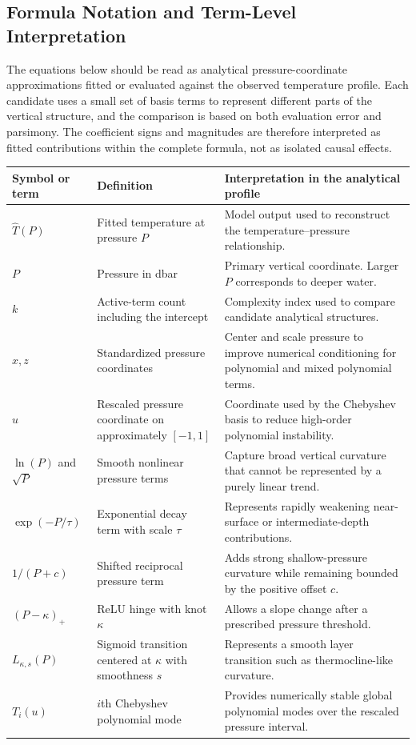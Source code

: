 \documentclass[10pt]{article}
\begin{document}
\subsection{Formula Notation and Term-Level Interpretation}

\noindent
The equations below should be read as analytical pressure-coordinate approximations fitted or evaluated against the observed temperature profile.
Each candidate uses a small set of basis terms to represent different parts of the vertical structure, and the comparison is based on both evaluation error and parsimony.
The coefficient signs and magnitudes are therefore interpreted as fitted contributions within the complete formula, not as isolated causal effects.

\vspace{0.35em}
\begingroup
\small
\setlength{\tabcolsep}{5pt}
\renewcommand{\arraystretch}{1.18}
\begin{tabular}{L{3.2cm}L{4.4cm}L{7.0cm}}
\toprule
Symbol or term & Definition & Interpretation in the analytical profile \\
\midrule
$\hat{T}(P)$ & Fitted temperature at pressure $P$ & Model output used to reconstruct the temperature--pressure relationship. \\
$P$ & Pressure in dbar & Primary vertical coordinate. Larger $P$ corresponds to deeper water. \\
$k$ & Active-term count including the intercept & Complexity index used to compare candidate analytical structures. \\
$x,z$ & Standardized pressure coordinates & Center and scale pressure to improve numerical conditioning for polynomial and mixed polynomial terms. \\
$u$ & Rescaled pressure coordinate on approximately $[-1,1]$ & Coordinate used by the Chebyshev basis to reduce high-order polynomial instability. \\
$\ln(P)$ and $\sqrt{P}$ & Smooth nonlinear pressure terms & Capture broad vertical curvature that cannot be represented by a purely linear trend. \\
$\exp(-P/\tau)$ & Exponential decay term with scale $\tau$ & Represents rapidly weakening near-surface or intermediate-depth contributions. \\
$1/(P+c)$ & Shifted reciprocal pressure term & Adds strong shallow-pressure curvature while remaining bounded by the positive offset $c$. \\
$(P-\kappa)_+$ & ReLU hinge with knot $\kappa$ & Allows a slope change after a prescribed pressure threshold. \\
$L_{\kappa,s}(P)$ & Sigmoid transition centered at $\kappa$ with smoothness $s$ & Represents a smooth layer transition such as thermocline-like curvature. \\
$T_i(u)$ & $i$th Chebyshev polynomial mode & Provides numerically stable global polynomial modes over the rescaled pressure interval. \\
\bottomrule
\end{tabular}
\endgroup
\end{document}
